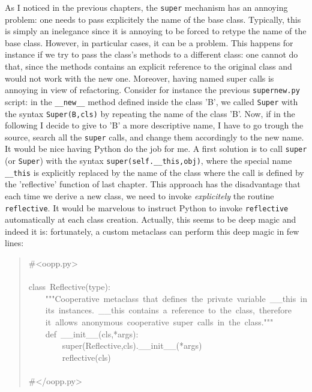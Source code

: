 \documentclass[10pt,english]{article}
\begin{document}
As I noticed in the previous chapters, the \texttt{super} 
mechanism has an annoying 
problem: one needs to pass explicitely the name of the base class. Typically, 
this is simply an 
inelegance since it is annoying to be forced to retype the name of the base 
class. However, in particular
cases, it can be a problem. This happens for instance if we try to
pass the class's methods to a different class: one cannot do that,
since the methods contains an explicit reference to the original class
and would not work with the new one. Moreover, having named super calls
is annoying in view of refactoring. Consider for
instance the previous \texttt{supernew.py} script: in the \texttt{{\_}{\_}new{\_}{\_}} method
defined inside the class 'B', we called \texttt{Super} with the syntax
\texttt{Super(B,cls)} by repeating the name of the class 'B'. Now,
if in the following I decide to give to 'B' a more descriptive
name, I have to go trough the source, search all the \texttt{super}
calls, and change them accordingly to the new name. It would be
nice having Python do the job for me. A first solution is to call
\texttt{super} (or \texttt{Super}) with the syntax \texttt{super(self.{\_}{\_}this,obj)},
where the special name \texttt{{\_}{\_}this} is explicitly replaced by the name 
of the class where the call is defined by the 'reflective' function
of last chapter. This approach has the disadvantage that each time we
derive a new class, we need to invoke \emph{explicitely} the routine 
\texttt{reflective}. It would be marvelous to instruct Python to invoke
\texttt{reflective} automatically at each class creation. Actually, this
seems to be deep magic and indeed it is: fortunately, a custom metaclass 
can perform this deep magic in few lines:
\begin{quote}
\begin{ttfamily}\begin{flushleft}
\mbox{{\#}<oopp.py>}\\
\mbox{~~}\\
\mbox{class~Reflective(type):}\\
\mbox{~~~~"""Cooperative~metaclass~that~defines~the~private~variable~{\_}{\_}this~in}\\
\mbox{~~~~its~instances.~{\_}{\_}this~contains~a~reference~to~the~class,~therefore}\\
\mbox{~~~~it~allows~anonymous~cooperative~super~calls~in~the~class."""}\\
\mbox{~~~~def~{\_}{\_}init{\_}{\_}(cls,*args):}\\
\mbox{~~~~~~~~super(Reflective,cls).{\_}{\_}init{\_}{\_}(*args)}\\
\mbox{~~~~~~~~reflective(cls)}\\
\mbox{}\\
\mbox{{\#}</oopp.py>}
\end{flushleft}\end{ttfamily}
\end{quote}
\end{document}
